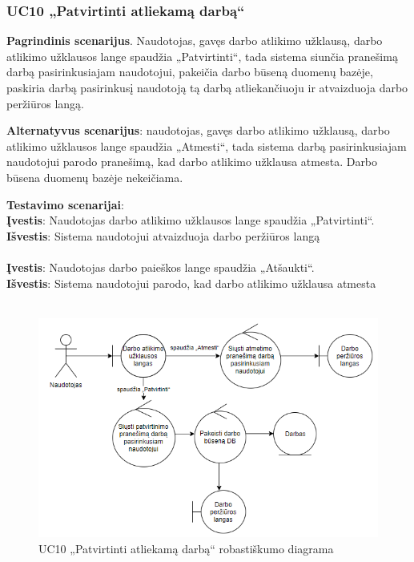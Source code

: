 \documentclass{VUMIFPSbakalaurinis}
\begin{document}
\subsubsection{UC10 „Patvirtinti atliekamą darbą“}
\textbf{Pagrindinis scenarijus}. Naudotojas, gavęs darbo atlikimo užklausą, darbo atlikimo užklausos lange spaudžia „Patvirtinti“, tada sistema siunčia pranešimą darbą pasirinkusiajam naudotojui, pakeičia darbo būseną duomenų bazėje, paskiria darbą pasirinkusį naudotoją tą darbą atliekančiuoju ir atvaizduoja darbo peržiūros langą. 
\par \textbf{Alternatyvus scenarijus}: naudotojas, gavęs darbo atlikimo užklausą, darbo atlikimo užklausos lange spaudžia „Atmesti“, tada sistema darbą pasirinkusiajam naudotojui parodo pranešimą, kad darbo atlikimo užklausa atmesta. Darbo būsena duomenų bazėje nekeičiama.
\par \textbf{Testavimo scenarijai}:\\
\textbf{Įvestis}: Naudotojas darbo atlikimo užklausos lange spaudžia „Patvirtinti“. \\
\textbf{Išvestis}: Sistema naudotojui atvaizduoja darbo peržiūros langą \\ \\
\textbf{Įvestis}: Naudotojas darbo paieškos lange spaudžia „Atšaukti“. \\
\textbf{Išvestis}: Sistema naudotojui parodo, kad darbo atlikimo užklausa atmesta\\ \\


\begin{figure}[H]
	\centering
	\includegraphics[scale=0.6]{img/Robustness/UC10}
	\caption{UC10 „Patvirtinti atliekamą darbą“ robastiškumo diagrama}
	\label{img:uc10rob}
\end{figure}
\end{document}
